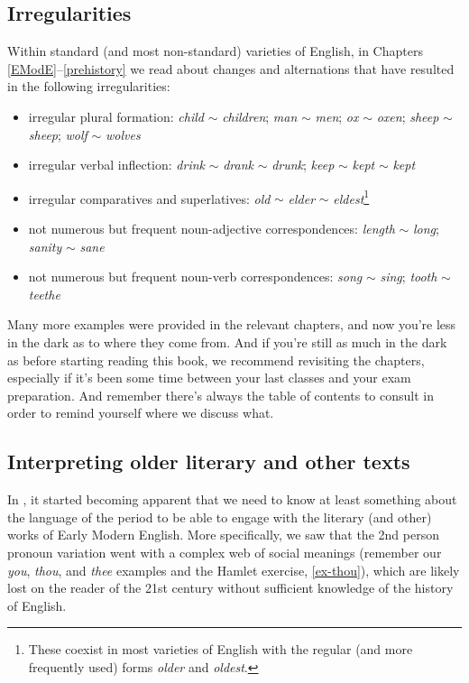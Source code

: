 \subsection{Irregularities}
Within standard (and most non-standard) varieties of English, in Chapters \ref{EModE}--\ref{prehistory} we read about changes and alternations that have resulted in the following irregularities:

\begin{itemize}
    \item irregular plural formation: \textit{child} $\sim$ \textit{children}; \textit{man} $\sim$ \textit{men}; \textit{ox} $\sim$ \textit{oxen}; \textit{sheep} $\sim$ \textit{sheep}; \textit{wolf} $\sim$ \textit{wolves} 
    \item irregular verbal inflection: \textit{drink} $\sim$ \textit{drank} $\sim$ \textit{drunk}; \textit{keep} $\sim$ \textit{kept} $\sim$ \textit{kept}
    \item irregular comparatives and superlatives: \textit{old} $\sim$ \textit{elder} $\sim$ \textit{eldest}\footnote{These coexist in most varieties of English with the regular (and more frequently used) forms \emph{older} and \emph{oldest}.}
    \item not numerous but frequent noun-adjective correspondences: \textit{length} $\sim$ \textit{long}; \textit{sanity} $\sim$ \textit{sane}
    \item not numerous but frequent noun-verb correspondences: \textit{song} $\sim$ \textit{sing}; \textit{tooth} $\sim$ \textit{teethe}
\end{itemize}

\noindent Many more examples were provided in the relevant chapters, and now you're less in the dark as to where they come from. And if you're still as much in the dark as before starting reading this book, we recommend revisiting the chapters, especially if it's been some time between your last classes and your exam preparation. And remember there's always the table of contents to consult in order to remind yourself where we discuss what.

\subsection{Interpreting older literary and other texts}
In , it started becoming apparent that we need to know at least something about the language of the period to be able to engage with the literary (and other) works of Early Modern English. More specifically, we saw that the 2nd person pronoun variation went with a complex web of social meanings (remember our \textit{you}, \textit{thou}, and \textit{thee} examples and the Hamlet exercise, \ref{ex-thou}), which are likely lost on the reader of the 21st century without sufficient knowledge of the history of English.

